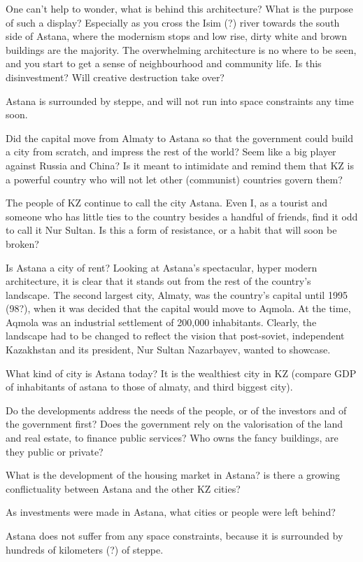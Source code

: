 \documentclass[11pt]{article}
\begin{document}
One can't help to wonder, what is behind this architecture? What is the purpose of such a display? Especially as you cross the Isim (?) river towards the south side of Astana, where the modernism stops and low rise, dirty white and brown buildings are the majority. The overwhelming architecture is no where to be seen, and you start to get a sense of neighbourhood and community life. Is this disinvestment? Will creative destruction take over?

Astana is surrounded by steppe, and will not run into space constraints any time soon. 

Did the capital move from Almaty to Astana so that the government could build a city from scratch, and impress the rest of the world? Seem like a big player against Russia and China? Is it meant to intimidate and remind them that KZ is a powerful country who will not let other (communist) countries govern them?  \cite{einstein}


The people of KZ continue to call the city Astana. Even I, as a tourist and someone who has little ties to the country besides a handful of friends, find it odd to call it Nur Sultan. Is this a form of resistance, or a habit that will soon be broken?


Is Astana a city of rent? Looking at Astana's spectacular, hyper modern architecture, it is clear that it stands out from the rest of the country's landscape. The second largest city, Almaty, was the country's capital until 1995 (98?), when it was decided that the capital would move to Aqmola. At the time, Aqmola was an industrial settlement of 200,000 inhabitants. Clearly, the landscape had to be changed to reflect the vision that post-soviet, independent Kazakhstan and its president, Nur Sultan Nazarbayev, wanted to showcase. 

What kind of city is Astana today? It is the wealthiest city in KZ (compare GDP of inhabitants of astana to those of almaty, and third biggest city). 

Do the developments address the needs of the people, or of the investors and of the government first?
Does the government rely on the valorisation of the land and real estate, to finance public services? Who owns the fancy buildings, are they public or private?

What is the development of the housing market in Astana?
is there a growing conflictuality between Astana and the other KZ cities?

As investments were made in Astana, what cities or people were left behind?

Astana does not suffer from any space constraints, because it is surrounded by hundreds of kilometers (?) of steppe. 
\end{document}
